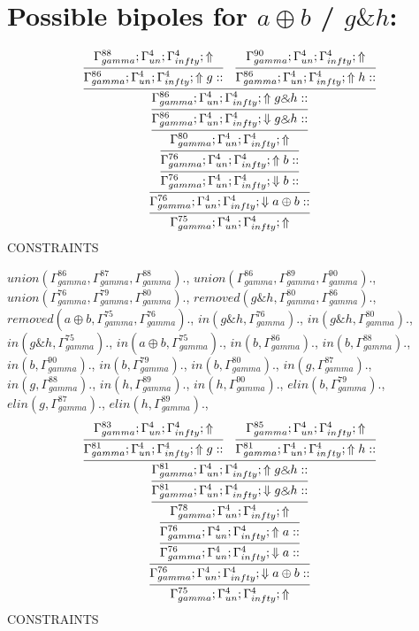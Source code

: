 \documentclass[a4paper, 11pt]{article}
\begin{document}
\section{Possible bipoles for $a \oplus b$ / $g \binampersand h$:} 

{\small
\[
\infer{\Gamma_{ gamma}^{75} ; \Gamma_{un}^{4} ; \Gamma_{ infty}^{4} ;  \Uparrow }
{\infer{\Gamma_{ gamma}^{76} ; \Gamma_{un}^{4} ; \Gamma_{ infty}^{4} ;  \Downarrow a \oplus b :: }
{\infer{\Gamma_{ gamma}^{76} ; \Gamma_{un}^{4} ; \Gamma_{ infty}^{4} ;  \Downarrow b :: }
{\infer{\Gamma_{ gamma}^{76} ; \Gamma_{un}^{4} ; \Gamma_{ infty}^{4} ;  \Uparrow b :: }
{\infer{\Gamma_{ gamma}^{80} ; \Gamma_{un}^{4} ; \Gamma_{ infty}^{4} ;  \Uparrow }
{\infer{\Gamma_{ gamma}^{86} ; \Gamma_{un}^{4} ; \Gamma_{ infty}^{4} ;  \Downarrow g \binampersand h :: }
{\infer{\Gamma_{ gamma}^{86} ; \Gamma_{un}^{4} ; \Gamma_{ infty}^{4} ;  \Uparrow g \binampersand h :: }
{\infer{\Gamma_{ gamma}^{86} ; \Gamma_{un}^{4} ; \Gamma_{ infty}^{4} ;  \Uparrow g :: }
{\Gamma_{ gamma}^{88} ; \Gamma_{un}^{4} ; \Gamma_{ infty}^{4} ;  \Uparrow }
&
\infer{\Gamma_{ gamma}^{86} ; \Gamma_{un}^{4} ; \Gamma_{ infty}^{4} ;  \Uparrow h :: }
{\Gamma_{ gamma}^{90} ; \Gamma_{un}^{4} ; \Gamma_{ infty}^{4} ;  \Uparrow }}}}}}}}
\]
}
CONSTRAINTS

$union(\Gamma_{gamma}^{86}, \Gamma_{gamma}^{87}, \Gamma_{gamma}^{88}).$, $union(\Gamma_{gamma}^{86}, \Gamma_{gamma}^{89}, \Gamma_{gamma}^{90}).$, $union(\Gamma_{gamma}^{76}, \Gamma_{gamma}^{79}, \Gamma_{gamma}^{80}).$, $removed(g \binampersand h, \Gamma_{gamma}^{80}, \Gamma_{gamma}^{86}).$, $removed(a \oplus b, \Gamma_{gamma}^{75}, \Gamma_{gamma}^{76}).$, $in(g \binampersand h, \Gamma_{gamma}^{76}).$, $in(g \binampersand h, \Gamma_{gamma}^{80}).$, $in(g \binampersand h, \Gamma_{gamma}^{75}).$, $in(a \oplus b, \Gamma_{gamma}^{75}).$, $in(b, \Gamma_{gamma}^{86}).$, $in(b, \Gamma_{gamma}^{88}).$, $in(b, \Gamma_{gamma}^{90}).$, $in(b, \Gamma_{gamma}^{79}).$, $in(b, \Gamma_{gamma}^{80}).$, $in(g, \Gamma_{gamma}^{87}).$, $in(g, \Gamma_{gamma}^{88}).$, $in(h, \Gamma_{gamma}^{89}).$, $in(h, \Gamma_{gamma}^{90}).$, $elin(b, \Gamma_{gamma}^{79}).$, $elin(g, \Gamma_{gamma}^{87}).$, $elin(h, \Gamma_{gamma}^{89}).$, 
{\small
\[
\infer{\Gamma_{ gamma}^{75} ; \Gamma_{un}^{4} ; \Gamma_{ infty}^{4} ;  \Uparrow }
{\infer{\Gamma_{ gamma}^{76} ; \Gamma_{un}^{4} ; \Gamma_{ infty}^{4} ;  \Downarrow a \oplus b :: }
{\infer{\Gamma_{ gamma}^{76} ; \Gamma_{un}^{4} ; \Gamma_{ infty}^{4} ;  \Downarrow a :: }
{\infer{\Gamma_{ gamma}^{76} ; \Gamma_{un}^{4} ; \Gamma_{ infty}^{4} ;  \Uparrow a :: }
{\infer{\Gamma_{ gamma}^{78} ; \Gamma_{un}^{4} ; \Gamma_{ infty}^{4} ;  \Uparrow }
{\infer{\Gamma_{ gamma}^{81} ; \Gamma_{un}^{4} ; \Gamma_{ infty}^{4} ;  \Downarrow g \binampersand h :: }
{\infer{\Gamma_{ gamma}^{81} ; \Gamma_{un}^{4} ; \Gamma_{ infty}^{4} ;  \Uparrow g \binampersand h :: }
{\infer{\Gamma_{ gamma}^{81} ; \Gamma_{un}^{4} ; \Gamma_{ infty}^{4} ;  \Uparrow g :: }
{\Gamma_{ gamma}^{83} ; \Gamma_{un}^{4} ; \Gamma_{ infty}^{4} ;  \Uparrow }
&
\infer{\Gamma_{ gamma}^{81} ; \Gamma_{un}^{4} ; \Gamma_{ infty}^{4} ;  \Uparrow h :: }
{\Gamma_{ gamma}^{85} ; \Gamma_{un}^{4} ; \Gamma_{ infty}^{4} ;  \Uparrow }}}}}}}}
\]
}
CONSTRAINTS
\end{document}

